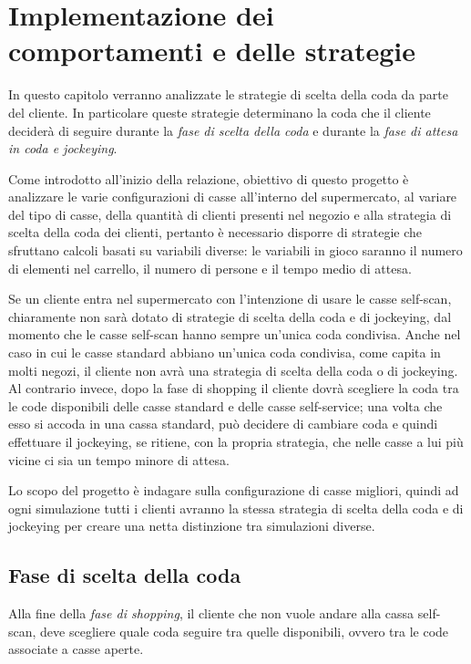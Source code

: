 \chapter{Implementazione dei comportamenti e delle strategie}
\label{implementation:intro}

In questo capitolo verranno analizzate le strategie di scelta della coda da parte del cliente. In particolare queste strategie determinano la coda che il cliente deciderà di seguire durante la \textit{fase di scelta della coda} e durante la \textit{fase di attesa in coda e jockeying}. 

 Come introdotto all'inizio della relazione, obiettivo di questo progetto è analizzare le varie configurazioni di casse all'interno del supermercato, al variare del tipo di casse, della quantità di clienti presenti nel negozio e alla strategia di scelta della coda dei clienti, pertanto è necessario disporre di strategie che sfruttano calcoli basati su variabili diverse: le variabili in gioco saranno il numero di elementi nel carrello, il numero di persone e il tempo medio di attesa.

Se un cliente entra nel supermercato con l'intenzione di usare le casse self-scan, chiaramente non sarà dotato di strategie di scelta della coda e di jockeying, dal momento che le casse self-scan hanno sempre un'unica coda condivisa. Anche nel caso in cui le casse standard abbiano un'unica coda condivisa, come capita in molti negozi, il cliente non avrà una strategia di scelta della coda o di jockeying. Al contrario invece, dopo la fase di shopping il cliente dovrà scegliere la coda tra le code disponibili delle casse standard e delle casse self-service; una volta che esso si accoda in una cassa standard, può decidere di cambiare coda e quindi effettuare il jockeying, se ritiene, con la propria strategia, che nelle casse a lui più vicine ci sia un tempo minore di attesa.

Lo scopo del progetto è indagare sulla configurazione di casse migliori, quindi ad ogni simulazione tutti i clienti avranno la stessa strategia di scelta della coda e di jockeying per creare una netta distinzione tra simulazioni diverse.

\section{Fase di scelta della coda}

Alla fine della \textit{fase di shopping}, il cliente che non vuole andare alla cassa self-scan, deve scegliere quale coda seguire tra quelle disponibili, ovvero tra le code associate a casse aperte. 

